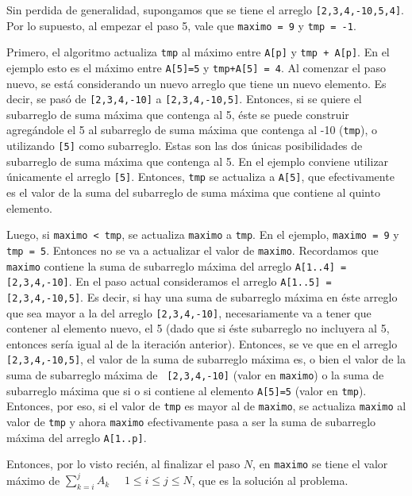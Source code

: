 Sin perdida de generalidad, supongamos que se tiene el arreglo \texttt{[2,3,4,-10,5,4]}. Por lo supuesto, al empezar el paso 5, vale que \texttt{maximo = 9} y \texttt{tmp = -1}.

Primero, el algoritmo actualiza \texttt{tmp} al máximo entre \texttt{A[p]} y  \texttt{tmp + A[p]}. En el ejemplo esto es el máximo entre \texttt{A[5]=5} y \texttt{tmp+A[5] = 4}. Al comenzar el paso nuevo, se está considerando un nuevo arreglo que tiene un nuevo elemento. Es decir, se pasó de \texttt{[2,3,4,-10]} a \texttt{[2,3,4,-10,5]}. Entonces, si se quiere el subarreglo de suma máxima que contenga al 5, éste se puede construir agregándole el 5 al subarreglo de suma máxima que contenga al -10 (\texttt{tmp}), o utilizando \texttt{[5]} como subarreglo. Estas son las dos únicas posibilidades de subarreglo de suma máxima que contenga al 5. En el ejemplo conviene utilizar únicamente el arreglo \texttt{[5]}. Entonces, \texttt{tmp} se actualiza a \texttt{A[5]}, que efectivamente es el valor de la suma del subarreglo de suma máxima que contiene al quinto elemento.

Luego, si \texttt{maximo < tmp}, se actualiza \texttt{maximo} a \texttt{tmp}. En el ejemplo, \texttt{maximo = 9} y \texttt{tmp = 5}. Entonces no se va a actualizar el valor de \texttt{maximo}. Recordamos que \texttt{maximo} contiene la suma de subarreglo máxima del arreglo \texttt{A[1..4] = [2,3,4,-10]}. En el paso actual consideramos el arreglo \texttt{A[1..5] = [2,3,4,-10,5]}. Es decir, si hay una suma de subarreglo máxima en éste arreglo que sea mayor a la del arreglo \texttt{[2,3,4,-10]}, necesariamente va a tener que contener al elemento nuevo, el 5 (dado que si éste subarreglo no incluyera al 5, entonces sería igual al de la iteración anterior). Entonces, se ve que en el arreglo \texttt{[2,3,4,-10,5]}, el valor de la suma de subarreglo máxima es, o bien el valor de la suma de subarreglo máxima de \texttt{ [2,3,4,-10]} (valor en \texttt{maximo}) o la suma de subarreglo máxima que si o si contiene al elemento \texttt{A[5]=5} (valor en \texttt{tmp}). Entonces, por eso, si el valor de \texttt{tmp} es mayor al de \texttt{maximo}, se actualiza \texttt{maximo} al valor de \texttt{tmp} y ahora \texttt{maximo} efectivamente pasa a ser la suma de subarreglo máxima del arreglo \texttt{A[1..p]}.

Entonces, por lo visto recién, al finalizar el paso $N$, en \texttt{maximo} se tiene el valor máximo de $\sum_{k=i}^{j} A_k$            $ \quad 1\leq i\leq j\leq N$, que es la solución al problema.

